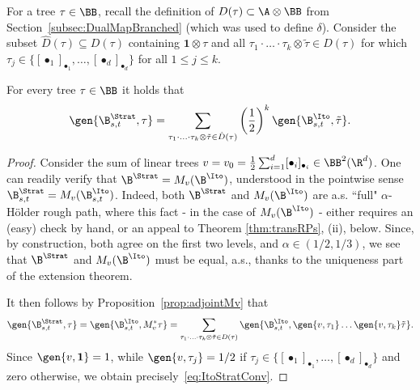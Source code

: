 \documentclass{article}
\begin{document}
For a tree $\tau \in \BB$, recall the definition of $D(\tau) \subset \A \otimes \BB$ from Section~\ref{subsec:DualMapBranched} (which was used to define $\delta$). Consider the subset $\hat D(\tau) \subseteq D(\tau)$ containing $\mathbf{1} \otimes \tau$ and all $\tau_1 \cdot \ldots \cdot \tau_k \otimes \tilde \tau \in D(\tau)$ for which $\tau_j \in \{[\bullet_1]_{\bullet_1}, \ldots, [\bullet_d]_{\bullet_d}\}$ for all $1 \leq j \leq k$.

\begin{proposition}
For every tree $\tau \in \BB$ it holds that
\begin{equation}\label{eq:ItoStratConv}
\gen{\B^\Strat_{s,t},\tau} = \sum_{\tau_1 \cdot \ldots \cdot \tau_k \otimes \tilde \tau \in \hat D(\tau)} \left(\frac{1}{2}\right)^{k} \gen{\B^\Ito_{s,t}, \tilde \tau}.
\end{equation}
\end{proposition}

\begin{proof}
Consider the sum of linear trees $v = v_0 = \frac{1}{2}\sum_{i=1}^d [\bullet_{i}]_{\bullet_i} \in \BB^2(\R^d)$. One can readily verify that $\B^\Strat = M_v(\B^\Ito)$, understood in the pointwise sense $\B^\Strat_{s,t} = M_v(\B^\Ito_{s,t})$. Indeed, both $\B^\Strat $ and $M_v(\B^\Ito)$ are a.s. ``full" $\alpha$-H\"older rough path, where this fact - in the case of $M_v(\B^\Ito)$ - either requires an (easy) check by hand, or an appeal to Theorem \ref{thm:transRPs}, (ii), below. Since, by construction, both agree on the first two levels, and $\alpha \in (1/2,1/3)$, we see that $\B^\Strat $ and $M_v(\B^\Ito)$ must be equal, a.s., thanks to the uniqueness part of the extension theorem. 

It then follows by Proposition~\ref{prop:adjointMv} that
\[
\gen{\B^\Strat_{s,t}, \tau} = \gen{\B^\Ito_{s,t}, M_v^* \tau} = \sum_{\tau_1 \cdot \ldots \cdot \tau_k \otimes \tilde \tau \in D(\tau)} \gen{\B^\Ito_{s,t}, \gen{v,\tau_1}\ldots \gen{v,\tau_k} \tilde \tau}.
\]
Since $\gen{v,\mathbf{1}} = 1$, while $\gen{v, \tau_j} = 1/2$ if $\tau_j \in \{[\bullet_1]_{\bullet_1}, \ldots, [\bullet_d]_{\bullet_d}\}$ and zero otherwise, we obtain precisely~\eqref{eq:ItoStratConv}.
\end{proof}
\end{document}
